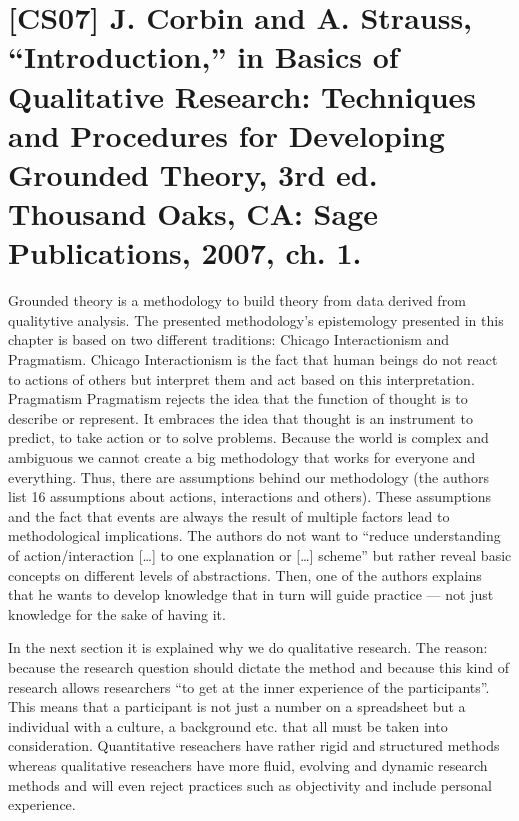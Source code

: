 \documentclass[a4paper,12pt,english]{scrartcl}
\newcommand{\papertitle}[2]{
	\section{[#1] #2}
}
\begin{document}
\pagestyle{fancy} %

\papertitle{CS07}{J. Corbin and A. Strauss, \enquote{Introduction,} in Basics of Qualitative Research: Techniques and Procedures for Developing Grounded Theory, 3rd ed. Thousand Oaks, CA: Sage Publications, 2007, ch. 1.}


Grounded theory is a methodology to build theory from data derived from qualitytive analysis. The presented methodology's epistemology presented in this chapter is based on two different traditions: Chicago Interactionism and Pragmatism. Chicago Interactionism is the fact that human beings do not react to actions of others but interpret them and act based on this interpretation. Pragmatism Pragmatism rejects the idea that the function of thought is to describe or represent. It embraces the idea that thought is an instrument to predict, to take action or to solve problems. Because the world is complex and ambiguous we cannot create a big methodology that works for everyone and everything. Thus, there are assumptions behind our methodology (the authors list 16 assumptions about actions, interactions and others). These assumptions and the fact that events are always the result of multiple factors lead to methodological implications. The authors do not want to \enquote{reduce understanding of action/interaction [\ldots] to one explanation or [\ldots] scheme} but rather reveal basic concepts on different levels of abstractions. Then, one of the authors explains that he wants to develop knowledge that in turn will guide practice --- not just knowledge for the sake of having it.

In the next section it is explained why we do qualitative research. The reason: because the research question should dictate the method and because this kind of research allows researchers \enquote{to get at the inner experience of the participants}. This means that a participant is not just a number on a spreadsheet but a individual with a culture, a background etc. that all must be taken into consideration. Quantitative reseachers have rather rigid and structured methods whereas qualitative reseachers have more fluid, evolving and dynamic research methods and will even reject practices such as objectivity and include personal experience.
\end{document}
